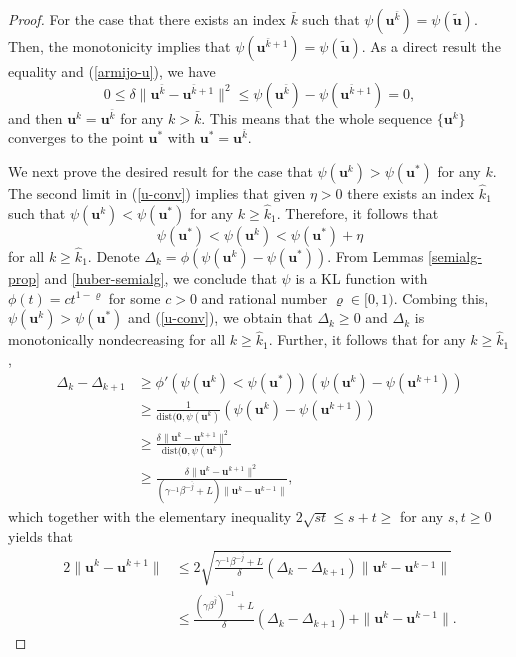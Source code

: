 \documentclass{article}
\numberwithin{equation}{section}
\begin{document}
\begin{proof}
For the case that there exists an index $\bar{k}$ such that $\psi(\mathbf{u}^{\bar{k}})= \psi(\tilde{\mathbf{u}})$. Then, the monotonicity  implies that
$\psi(\mathbf{u}^{\bar{k}+1})= \psi(\tilde{\mathbf{u}})$. As a direct result the equality and (\ref{armijo-u}), we have
$$0\leq\delta\|\mathbf{u}^{\bar{k}}-\mathbf{u}^{\bar{k}+1}\|^2\leq \psi(\mathbf{u}^{\bar{k}})-\psi(\mathbf{u}^{\bar{k}+1})=0,$$
and then $\mathbf{u}^{k}=\mathbf{u}^{\bar{k}}$ for any $k>\bar{k}$. This means that the whole sequence $\{\mathbf{u}^k\}$ converges to the point $\mathbf{u}^*$ with $\mathbf{u}^*=\mathbf{u}^{\bar{k}}$.

We next prove the desired result for the case that $\psi(\mathbf{u}^k)> \psi(\mathbf{u}^*)$ for any $k$. The second limit in (\ref{u-conv}) implies that given $\eta>0$ there exists an index $\hat{k}_1$ such that $\psi(\mathbf{u}^k)<\psi(\mathbf{u}^*)$ for any $k\geq \hat{k}_1$. Therefore, it follows that
\begin{equation}\label{psi-eta}\psi(\mathbf{u}^*)<\psi(\mathbf{u}^k)<\psi(\mathbf{u}^*)+\eta\end{equation}
for all $k\geq \hat{k}_1$. Denote $\Delta_k=\phi(\psi(\mathbf{u}^k)-\psi(\mathbf{u}^*))$.  From Lemmas \ref{semialg-prop} and \ref{huber-semialg}, we conclude  that
$\psi$ is a KL function with $\phi(t)=ct^{1-\varrho}$ for some $c>0$ and rational number $\varrho\in[0,1).$ Combing this, $\psi(\mathbf{u}^k)>\psi(\mathbf{u}^*)$ and  (\ref{u-conv}), we obtain that $\Delta_k\geq0$ and $\Delta_k$ is monotonically nondecreasing for all $k\geq \hat{k}_1$. Further, it follows that for any $k\geq \hat{k}_1$,
\begin{equation}
	\begin{aligned}
		\Delta_k-\Delta_{k+1}&\geq\phi'(\psi(\mathbf{u}^k)<\psi(\mathbf{u}^*))(\psi(\mathbf{u}^k)-\psi(\mathbf{u}^{k+1}))\\
		&\geq\frac{1}{\mathrm{dist}(\mathbf{0},\psi(\mathbf{u}^k)}(\psi(\mathbf{u}^k)-\psi(\mathbf{u}^{k+1}))\\
		&\geq\frac{\delta\|\mathbf{u}^k-\mathbf{u}^{k+1}\|^2}{\mathrm{dist}(\mathbf{0},\psi(\mathbf{u}^k)}\\
		&\geq\frac{\delta\|\mathbf{u}^k-\mathbf{u}^{k+1}\|^2}{(\gamma^{-1}\beta^{-\bar{j}}+L)\|\mathbf{u}^k-\mathbf{u}^{k-1}\|},
	\end{aligned}\nonumber\end{equation}
which together with the elementary inequality $2\sqrt{st}\leq s+t\geq$ for any $s,t\geq0$ yields that
\begin{equation}\label{psi-diff}
	\begin{aligned}
		2\|\mathbf{u}^k-\mathbf{u}^{k+1}\|&\leq
		2\sqrt{\frac{\gamma^{-1}\beta^{-\bar{j}}+L}{\delta}(\Delta_k-\Delta_{k+1})\|\mathbf{u}^k-\mathbf{u}^{k-1}\|}\\
		&\leq\frac{(\gamma\beta^{\bar{j}})^{-1}+L}{\delta}(\Delta_k-\Delta_{k+1})+\|\mathbf{u}^k-\mathbf{u}^{k-1}\|.
\end{aligned}\end{equation}



\end{proof}
\end{document}
